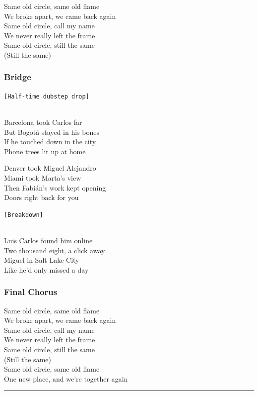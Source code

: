 Same old circle, same old flame\\
We broke apart, we came back again\\
Same old circle, call my name\\
We never really left the frame\\
Same old circle, still the same\\
(Still the same)

\subsubsection{Bridge}\label{bridge-11}

\texttt{{[}Half-time\ dubstep\ drop{]}}\strut \\
Barcelona took Carlos far\\
But Bogotá stayed in his bones\\
If he touched down in the city\\
Phone trees lit up at home

Denver took Miguel Alejandro\\
Miami took Marta's view\\
Then Fabián's work kept opening\\
Doors right back for you

\texttt{{[}Breakdown{]}}\strut \\
Luis Carlos found him online\\
Two thousand eight, a click away\\
Miguel in Salt Lake City\\
Like he'd only missed a day

\subsubsection{Final Chorus}\label{final-chorus-3}

Same old circle, same old flame\\
We broke apart, we came back again\\
Same old circle, call my name\\
We never really left the frame\\
Same old circle, still the same\\
(Still the same)\\
Same old circle, same old flame\\
One new place, and we're together again

\begin{center}\rule{0.5\linewidth}{0.5pt}\end{center}

